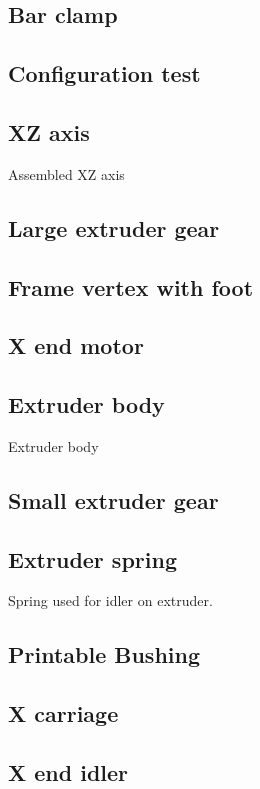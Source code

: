 \documentclass[11pt]{article}
\begin{document}
\subsection{Bar clamp}

\subsection{Configuration test}

\subsection{XZ axis}
Assembled XZ axis

\subsection{Large extruder gear}

\subsection{Frame vertex with foot}

\subsection{X end motor}

\subsection{Extruder body}
Extruder body

\subsection{Small extruder gear}

\subsection{Extruder spring}
Spring used for idler on extruder.

\subsection{Printable Bushing}

\subsection{X carriage}

\subsection{X end idler}
\end{document}
